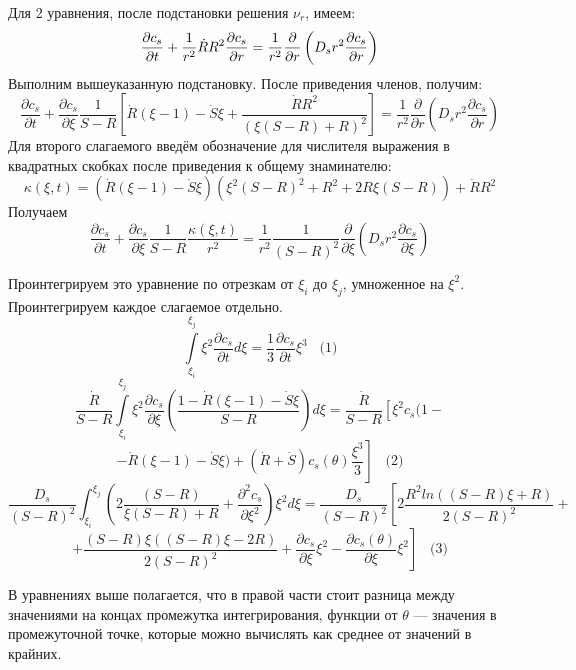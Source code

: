 \par Для 2 уравнения, после подстановки решения $\nu_{r}$, имеем:\\
$$\displaystyle \frac{\partial c_{s}}{\partial t}+\frac{1}{r^{2}}\dot{R}R^{2}\frac{\partial c_{s}}{\partial r}=\frac{1}{r^{2}}\frac{\partial}{\partial r}\left(D_{s}r^{2}\frac{\partial c_{s}}{\partial r}\right)$$
Выполним вышеуказанную подстановку. После приведения членов, получим:
$$\frac{\partial c_{s}}{\partial t}+\frac{\partial c_{s}}{\partial \xi}\frac{1}{S-R}\left[\dot{R}(\xi-1)-\dot{S}\xi+\frac{\dot{R}R^{2}}{(\xi(S-R)+R)^{2}}\right]=\frac{1}{r^{2}}\frac{\partial}{\partial r}\left(D_{s}r^{2}\frac{\partial c_{s}}{\partial r}\right)$$
Для второго слагаемого введём обозначение для числителя выражения в квадратных скобках после приведения к общему знаминателю:
$$\kappa(\xi,t)=\left(\dot{R}(\xi-1)-\dot{S}\xi\right)\left(\xi^{2}(S-R)^{2}+R^{2}+2R\xi(S-R)\right)+\dot{R}R^{2}$$
Получаем
$$\frac{\partial c_{s}}{\partial t}+\frac{\partial c_{s}}{\partial \xi}\frac{1}{S-R}\frac{\kappa(\xi,t)}{r^{2}}=\frac{1}{r^{2}}\frac{1}{(S-R)^{2}}\frac{\partial}{\partial \xi}\left(D_{s}r^{2}\frac{\partial c_{s}}{\partial \xi}\right)$$
\par Проинтегрируем это уравнение по отрезкам от $\xi_{i}$ до $\xi_{j}$, умноженное на $\xi^{2}$. Проинтегрируем каждое слагаемое отдельно.
$$\int\limits^{\xi_{j}}_{\xi_{i}}\xi^{2}\frac{\partial c_{s}}{\partial t}d\xi=\frac{1}{3}\frac{\partial c_{s}}{\partial t}\xi^{3}\;\;\;\text{(1)}$$
$$\frac{\dot{R}}{S-R}\int\limits^{\xi_{j}}_{\xi_{i}}\xi^{2}\frac{\partial c_{s}}{\partial \xi}\left(\frac{1-\dot{R}(\xi-1)-\dot{S}\xi}{S-R}\right)d\xi=\frac{\dot{R}}{S-R}\left[\xi^{2}c_{s}(1-\right.$$
$$\left.-\dot{R}(\xi-1)-\dot{S}\xi)+(\dot{R}+\dot{S})c_{s}(\theta)\frac{\xi^{3}}{3}\right]\;\;\;\text{(2)}$$
$$\frac{D_{s}}{(S-R)^{2}}\int^{\xi_{j}}_{\xi_{i}}\left(2\frac{(S-R)}{\xi(S-R)+R}+\frac{\partial^{2} c_{s}}{\partial \xi^{2}}\right)\xi^{2}d\xi=\frac{D_{s}}{(S-R)^{2}}\left[2\frac{R^{2}ln\left((S-R)\xi+R\right)}{2(S-R)^{2}}+\right.$$
$$+\left.\frac{(S-R)\xi((S-R)\xi-2R)}{2(S-R)^{2}}+\frac{\partial c_{s}}{\partial \xi}\xi^{2}-\frac{\partial c_{s}(\theta)}{\partial \xi}\xi^{2}\right]\;\;\;\text{(3)}$$
\par В уравнениях выше полагается, что в правой части стоит разница между значениями на концах промежутка интегрирования, функции от $\theta$ --- значения в промежуточной точке, которые можно вычислять как среднее от значений в крайних.
